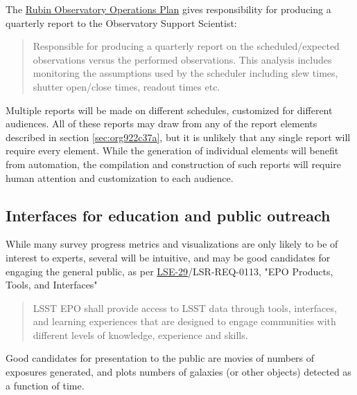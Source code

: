 The \href{https://docushare.lsst.org/docushare/dsweb/Get/Document-36797/Rubin\%20Observatory\%20Operations\%20Plan\%20April\%202020.pdf}{Rubin Observatory Operations Plan} gives responsibility for producing a quarterly report to the Observatory Support Scientist:
\begin{quote}
Responsible for producing a quarterly report on the scheduled/expected observations versus the performed observations. This analysis includes monitoring the assumptions used by the scheduler including slew times, shutter open/close times, readout times etc. 
\end{quote}

Multiple reports will be made on different schedules, customized for different audiences.
All of these reports may draw from any of the report elements described in section \ref{sec:org922c37a}, but it is unlikely that any single report will require every element.
While the generation of individual elements will benefit from automation, the compilation and construction of such reports will require human attention and customization to each audience.

\subsection{Interfaces for education and public outreach}
\label{sec:org67432c6}
While many survey progress metrics and visualizations are only likely to be of interest to experts, several will be intuitive, and may be good candidates for engaging the general public, as per \href{https://ls.st/lse-29}{LSE-29}/LSR-REQ-0113, "EPO Products, Tools, and Interfaces"
\begin{quote}
LSST EPO shall provide access to LSST data through tools, interfaces,
and learning experiences that are designed to engage communities with
different levels of knowledge, experience and skills.
\end{quote}
Good candidates for presentation to the public are movies of numbers of exposures generated, and plots numbers of galaxies (or other objects) detected as a function of time.
